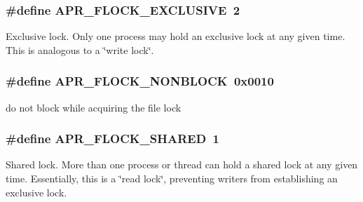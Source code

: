 \subsubsection[{\texorpdfstring{A\+P\+R\+\_\+\+F\+L\+O\+C\+K\+\_\+\+E\+X\+C\+L\+U\+S\+I\+VE}{APR_FLOCK_EXCLUSIVE}}]{\setlength{\rightskip}{0pt plus 5cm}\#define A\+P\+R\+\_\+\+F\+L\+O\+C\+K\+\_\+\+E\+X\+C\+L\+U\+S\+I\+VE~2}\hypertarget{group__apr__file__lock__types_gafbf0caa093b99bdf11e25360b9099852}{}\label{group__apr__file__lock__types_gafbf0caa093b99bdf11e25360b9099852}
Exclusive lock. Only one process may hold an exclusive lock at any given time. This is analogous to a \char`\"{}write lock\char`\"{}. 
\subsubsection[{\texorpdfstring{A\+P\+R\+\_\+\+F\+L\+O\+C\+K\+\_\+\+N\+O\+N\+B\+L\+O\+CK}{APR_FLOCK_NONBLOCK}}]{\setlength{\rightskip}{0pt plus 5cm}\#define A\+P\+R\+\_\+\+F\+L\+O\+C\+K\+\_\+\+N\+O\+N\+B\+L\+O\+CK~0x0010}\hypertarget{group__apr__file__lock__types_gab327fa0250e19006f20d5ec65fe7f22a}{}\label{group__apr__file__lock__types_gab327fa0250e19006f20d5ec65fe7f22a}
do not block while acquiring the file lock 
\subsubsection[{\texorpdfstring{A\+P\+R\+\_\+\+F\+L\+O\+C\+K\+\_\+\+S\+H\+A\+R\+ED}{APR_FLOCK_SHARED}}]{\setlength{\rightskip}{0pt plus 5cm}\#define A\+P\+R\+\_\+\+F\+L\+O\+C\+K\+\_\+\+S\+H\+A\+R\+ED~1}\hypertarget{group__apr__file__lock__types_gaba177fe81cd70b389753ad2096b2ce7c}{}\label{group__apr__file__lock__types_gaba177fe81cd70b389753ad2096b2ce7c}
Shared lock. More than one process or thread can hold a shared lock at any given time. Essentially, this is a \char`\"{}read lock\char`\"{}, preventing writers from establishing an exclusive lock. 
